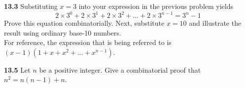 \documentclass[10pt]{article}
\begin{document}
\pagebreak

\begin{framed}
    \textbf{13.3} Substituting $x = 3$ into your expression in the previous problem yields
    $$
    2\times3^0+2\times3^1+2\times3^2+...+2\times3^{n-1} = 3^n-1
    $$
    Prove this equation combinatorially.
    Next, substitute $x = 10$ and illustrate the result using ordinary base-10 numbers.\\

    \noindent For reference, the expression that is being referred to is
    $
    (x-1)(1+x+x^2+...+x^{n-1})
    $.
\end{framed}

\pagebreak

\begin{framed}
    \textbf{13.5} Let $n$ be a positive integer. Give a combinatorial proof that $n^2 = n(n-1)+n$.
\end{framed}
\end{document}
